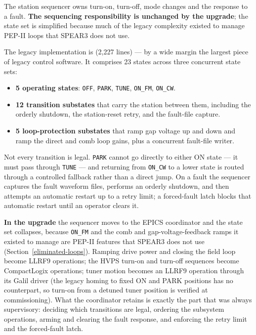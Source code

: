 The station sequencer owns turn-on, turn-off, mode changes and the response to a fault. \textbf{The sequencing responsibility is unchanged by the upgrade}; the state set is simplified because much of the legacy complexity existed to manage PEP-II loops that SPEAR3 does not use.

The legacy implementation is  (2,227 lines) --- by a wide margin the largest piece of legacy control software. It comprises 23 states across three concurrent state sets:

\begin{itemize}
\tightlist
\item
  \textbf{5 operating states}: \texttt{OFF}, \texttt{PARK}, \texttt{TUNE}, \texttt{ON\_FM}, \texttt{ON\_CW}.
\item
  \textbf{12 transition substates} that carry the station between them, including the orderly shutdown, the station-reset retry, and the fault-file capture.
\item
  \textbf{5 loop-protection substates} that ramp gap voltage up and down and ramp the direct and comb loop gains, plus a concurrent fault-file writer.
\end{itemize}

Not every transition is legal. \texttt{PARK} cannot go directly to either ON state --- it must pass through \texttt{TUNE} --- and returning from \texttt{ON\_CW} to a lower state is routed through a controlled fallback rather than a direct jump. On a fault the sequencer captures the fault waveform files, performs an orderly shutdown, and then attempts an automatic restart up to a retry limit; a forced-fault latch blocks that automatic restart until an operator clears it.

\textbf{In the upgrade} the sequencer moves to the EPICS coordinator and the state set collapses, because \texttt{ON\_FM} and the comb and gap-voltage-feedback ramps it existed to manage are PEP-II features that SPEAR3 does not use (Section~\ref{eliminated-loops}). Ramping drive power and closing the field loop become LLRF9 operations; the HVPS turn-on and turn-off sequences become CompactLogix operations; tuner motion becomes an LLRF9 operation through its Galil driver (the legacy homing to fixed ON and PARK positions has no counterpart, so turn-on from a detuned tuner position is verified at commissioning). What the coordinator retains is exactly the part that was always supervisory: deciding which transitions are legal, ordering the subsystem operations, arming and clearing the fault response, and enforcing the retry limit and the forced-fault latch.


